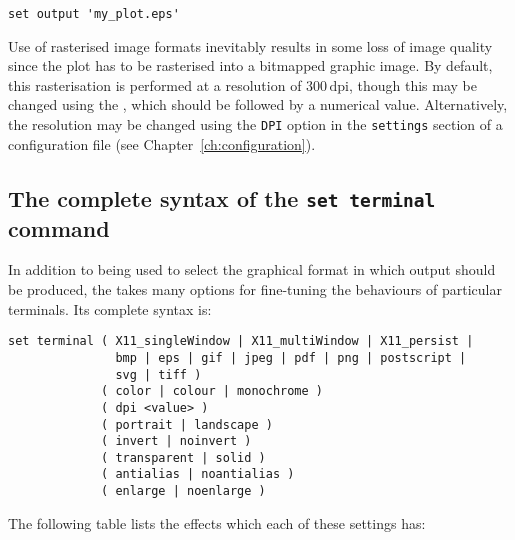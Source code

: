 \begin{verbatim}
set output 'my_plot.eps'
\end{verbatim}

Use of rasterised image formats inevitably results in some loss of image
quality since the plot has to be rasterised into a bitmapped graphic image. By
default, this rasterisation is performed at a resolution of
$300\,\mathrm{dpi}$, though this may be changed using the , which should be followed by a numerical value. Alternatively, the
resolution may be changed using the {\tt DPI} option in the {\tt settings}
section of a configuration file (see Chapter~\ref{ch:configuration}).

\subsection{The complete syntax of the {\tt set terminal} command}

In addition to being used to select the graphical format in which output should
be produced, the  takes many options for fine-tuning the
behaviours of particular terminals. Its complete syntax is:

\begin{verbatim}
set terminal ( X11_singleWindow | X11_multiWindow | X11_persist |
               bmp | eps | gif | jpeg | pdf | png | postscript |
               svg | tiff )
             ( color | colour | monochrome )
             ( dpi <value> )
             ( portrait | landscape )
             ( invert | noinvert )
             ( transparent | solid )
             ( antialias | noantialias )
             ( enlarge | noenlarge )
\end{verbatim}

The following table lists the effects which each of these settings has:

